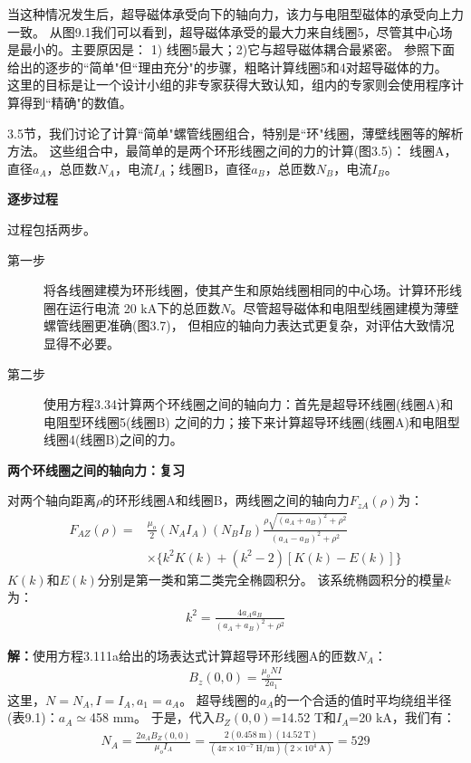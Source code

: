 当这种情况发生后，超导磁体承受向下的轴向力，该力与电阻型磁体的承受向上力一致。
从图9.1我们可以看到，超导磁体承受的最大力来自线圈5，尽管其中心场是最小的。主要原因是：
1) 线圈5最大；2)它与超导磁体耦合最紧密。
参照下面给出的逐步的``简单"但``理由充分"的步骤，粗略计算线圈5和4对超导磁体的力。
这里的目标是让一个设计小组的非专家获得大致认知，组内的专家则会使用程序计算得到``精确"的数值。

3.5节，我们讨论了计算``简单"螺管线圈组合，特别是``环"线圈，薄壁线圈等的解析方法。
这些组合中，最简单的是两个环形线圈之间的力的计算(图3.5)：
线圈A，直径$a_A$，总匝数$N_A$，电流$I_A$；线圈B，直径$a_B$，总匝数$N_B$，电流$I_B$。

\textbf{逐步过程}

过程包括两步。
\begin{description}
	\item[第一步] 将各线圈建模为环形线圈，使其产生和原始线圈相同的中心场。计算环形线圈在运行电流
	20 kA下的总匝数$N$。尽管超导磁体和电阻型线圈建模为薄壁螺管线圈更准确(图3.7)，
	但相应的轴向力表达式更复杂，对评估大致情况显得不必要。
\item[第二步] 使用方程3.34计算两个环线圈之间的轴向力：首先是超导环线圈(线圈A)和电阻型环线圈5(线圈B)
之间的力；接下来计算超导环线圈(线圈A)和电阻型线圈4(线圈B)之间的力。
\end{description}

\textbf{两个环线圈之间的轴向力：复习}

对两个轴向距离$\rho$的环形线圈A和线圈B，两线圈之间的轴向力$F_{zA}(\rho)$为：
\begin{align*}%
F_{AZ}(\rho)=&\frac{\mu_o}{2}(N_AI_A)(N_BI_B)\frac{\rho\sqrt{(a_A+a_B)^2+\rho^2}}{(a_A-a_B)^2+\rho^2}\\
&\times\{k^2K(k)+(k^2-2)[K(k)-E(k)]\} \tag{3.34}
\end{align*}
$K(k)$和$E(k)$分别是第一类和第二类完全椭圆积分。
该系统椭圆积分的模量$k$为：
\begin{align*}%
k^2=\frac{4a_Aa_B}{(a_A+a_B)^2+\rho^2} \tag{3.36}
\end{align*}

\textbf{解：}使用方程3.111a给出的场表达式计算超导环形线圈A的匝数$N_A$：
\begin{align*}%
B_z(0,0)=\frac{\mu_oNI}{2a_1} \tag{3.111a}
\end{align*}
这里，$N=N_A,I=I_A, a_1=a_A$。
超导线圈的$a_A$的一个合适的值时平均绕组半径(表9.1)：$a_A\simeq$458 mm。
于是，代入$B_Z(0,0)$=14.52 T和$I_A$=20 kA，我们有：
\begin{align*}%
N_A=\frac{2a_AB_Z(0,0)}{\mu_oI_A}=\frac{2(0.458\ \mathrm{m})(14.52\ \mathrm{T})}{(4\pi\times 10^{-7}\ \mathrm{H/m})(2\times 10^4\ \mathrm{A})}=529
\end{align*}

